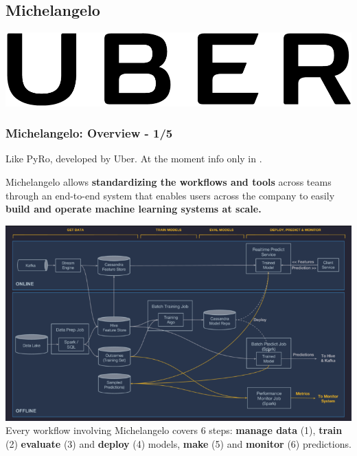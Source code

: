 \documentclass[hyperref={pdfpagelabels=false}]{beamer}
\begin{document}
     

     
     \subsection{Michelangelo} %
     \begin{frame}[c] %
       \begin{center}
         \vspace{8mm}
         \includegraphics[scale=0.1]{logo_uber.png}
       \end{center}
     \end{frame}

     
     \begin{frame}
       \frametitle{Michelangelo: Overview - 1/5}
       Like PyRo, developed by Uber. At the moment info only in \cite{michelangelo}.
       \begin{block}{} %
         \small{Michelangelo allows \textbf{standardizing the workflows and tools} across teams through an end-to-end system that enables users across the company to easily \textbf{build and operate machine learning systems at scale.}}
       \end{block}
       \begin{center}
          \includegraphics[scale=0.295]{michelangelo_pipeline.png}
          \scriptsize{\\Every workflow involving Michelangelo covers 6 steps: \textbf{manage data} (1), \textbf{train} (2) \textbf{evaluate} (3) and \textbf{deploy} (4) models,  \textbf{make} (5) and \textbf{monitor} (6) predictions.}
        \end{center}
     \end{frame}
     
\end{document}
